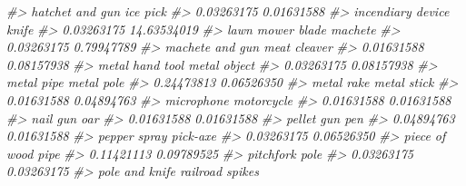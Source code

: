 \documentclass[
  12pt,
]{book}
\newenvironment{Shaded}{\begin{snugshade}}{\end{snugshade}}
\newcommand{\CommentTok}[1]{\textcolor[rgb]{0.37,0.37,0.37}{\textit{#1}}}
\begin{document}
\begin{Shaded}
\begin{Highlighting}[]
\CommentTok{\#\textgreater{}                  hatchet and gun                         ice pick }
\CommentTok{\#\textgreater{}                       0.03263175                       0.01631588 }
\CommentTok{\#\textgreater{}                incendiary device                            knife }
\CommentTok{\#\textgreater{}                       0.03263175                      14.63534019 }
\CommentTok{\#\textgreater{}                 lawn mower blade                          machete }
\CommentTok{\#\textgreater{}                       0.03263175                       0.79947789 }
\CommentTok{\#\textgreater{}                  machete and gun                     meat cleaver }
\CommentTok{\#\textgreater{}                       0.01631588                       0.08157938 }
\CommentTok{\#\textgreater{}                  metal hand tool                     metal object }
\CommentTok{\#\textgreater{}                       0.03263175                       0.08157938 }
\CommentTok{\#\textgreater{}                       metal pipe                       metal pole }
\CommentTok{\#\textgreater{}                       0.24473813                       0.06526350 }
\CommentTok{\#\textgreater{}                       metal rake                      metal stick }
\CommentTok{\#\textgreater{}                       0.01631588                       0.04894763 }
\CommentTok{\#\textgreater{}                       microphone                       motorcycle }
\CommentTok{\#\textgreater{}                       0.01631588                       0.01631588 }
\CommentTok{\#\textgreater{}                         nail gun                              oar }
\CommentTok{\#\textgreater{}                       0.01631588                       0.01631588 }
\CommentTok{\#\textgreater{}                       pellet gun                              pen }
\CommentTok{\#\textgreater{}                       0.04894763                       0.01631588 }
\CommentTok{\#\textgreater{}                     pepper spray                         pick{-}axe }
\CommentTok{\#\textgreater{}                       0.03263175                       0.06526350 }
\CommentTok{\#\textgreater{}                    piece of wood                             pipe }
\CommentTok{\#\textgreater{}                       0.11421113                       0.09789525 }
\CommentTok{\#\textgreater{}                        pitchfork                             pole }
\CommentTok{\#\textgreater{}                       0.03263175                       0.03263175 }
\CommentTok{\#\textgreater{}                   pole and knife                  railroad spikes }

\end{Highlighting}
\end{Shaded}
\end{document}
